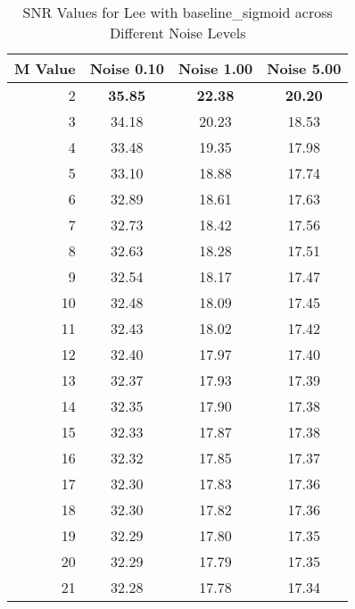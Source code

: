     \begin{table}[htb]
       \small

    \centering 
    \begin{tabular}{|r|ccc|}\hline
   M Value &  Noise 0.10 &  Noise 1.00 &  Noise 5.00 \\ \hline 
      2 &  \textbf{35.85} &  \textbf{22.38} &  \textbf{20.20}  \\ \hline 
      3 &  34.18 &  20.23 &  18.53  \\ \hline 
      4 &  33.48 &  19.35 &  17.98  \\ \hline 
      5 &  33.10 &  18.88 &  17.74  \\ \hline 
      6 &  32.89 &  18.61 &  17.63  \\ \hline 
      7 &  32.73 &  18.42 &  17.56  \\ \hline 
      8 &  32.63 &  18.28 &  17.51  \\ \hline 
      9 &  32.54 &  18.17 &  17.47  \\ \hline 
      10 &  32.48 &  18.09 &  17.45  \\ \hline 
      11 &  32.43 &  18.02 &  17.42  \\ \hline 
      12 &  32.40 &  17.97 &  17.40  \\ \hline 
      13 &  32.37 &  17.93 &  17.39  \\ \hline 
      14 &  32.35 &  17.90 &  17.38  \\ \hline 
      15 &  32.33 &  17.87 &  17.38  \\ \hline 
      16 &  32.32 &  17.85 &  17.37  \\ \hline 
      17 &  32.30 &  17.83 &  17.36  \\ \hline 
      18 &  32.30 &  17.82 &  17.36  \\ \hline 
      19 &  32.29 &  17.80 &  17.35  \\ \hline 
      20 &  32.29 &  17.79 &  17.35  \\ \hline 
      21 &  32.28 &  17.78 &  17.34  \\ \hline 
    \end{tabular}
    \caption{SNR Values for Lee with baseline_sigmoid across Different Noise Levels}
    \end{table}


